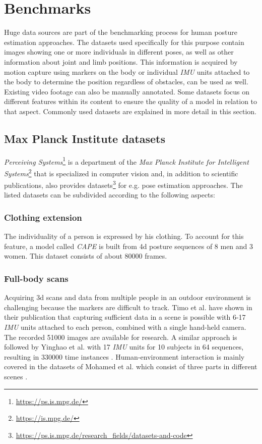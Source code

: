 \section{Benchmarks}
Huge data sources are part of the benchmarking process for human posture estimation approaches. The datasets used specifically for this purpose contain images showing one or more individuals in different poses, as well as other information about joint and limb positions. This information is acquired by motion capture using markers on the body or individual \emph{IMU} units attached to the body to determine the position regardless of obstacles, can be used as well. Existing video footage can also be manually annotated. Some datasets focus on different features within its content to ensure the quality of a model in relation to that aspect. Commonly used datasets are explained in more detail in this section.

\subsection{Max Planck Institute datasets}
\emph{Perceiving Systems}\footnote{\url{https://ps.is.mpg.de/}} is a department of the \emph{Max Planck Institute for Intelligent Systems}\footnote{\url{https://is.mpg.de/}} that is specialized in computer vision and, in addition to scientific publications, also provides datasets\footnote{\url{https://ps.is.mpg.de/research_fields/datasets-and-code}} for e.g. pose estimation approaches. The listed datasets can be subdivided according to the following aspects:

\subsubsection{Clothing extension}
The individuality of a person is expressed by his clothing. To account for this feature, a model called \emph{CAPE} is built from 4d posture sequences of 8 men and 3 women. This dataset consists of about 80000 frames. \cite{cape}


\subsubsection{Full-body scans}
Acquiring 3d scans and data from multiple people in an outdoor environment is challenging because the markers are difficult to track. Timo et al. have shown in their publication that capturing sufficient data in a scene is possible with 6-17 \emph{IMU} units attached to each person, combined with a single hand-held camera. The recorded 51000 images are available for research.\cite{vip} A similar approach is followed by Yinghao et al. with 17 \emph{IMU} units for 10 subjects in 64 sequences, resulting in 330000 time instances \cite{dip}. Human-environment interaction is mainly covered in the datasets of Mohamed et al. which consist of three parts in different scenes \cite{prox}.

